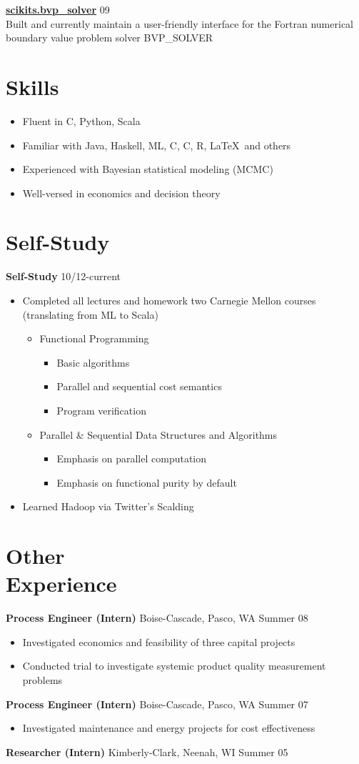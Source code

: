 \documentclass[margin]{res}
\newcommand{\bactivity}[3]{
  {\bf #1} #2 \hfill #3
    \vspace{6pt}
    \begin{itemize} \itemsep -2pt
      }
\newcommand{\eactivity}[0]{\end{itemize}}
\newcommand{\bitem}{\begin{itemize} \itemsep -2pt}
\newcommand{\eitem}{\end{itemize} }
\newcommand{\CPP}
{C\nolinebreak[4]\hspace{-.05em}\raisebox{.22ex}{\footnotesize\bf ++}}
\newcommand{\CS}
{C\nolinebreak[4]\hspace{-.05em}\raisebox{.22ex}{\footnotesize\bf \#}}
\begin{document}
\begin{resume}
    {\bf \href{packages.python.org/scikits.bvp\_solver}{scikits.bvp\_solver}} \hfill  09\\
      Built and currently maintain a user-friendly interface for the Fortran numerical \\
      boundary value problem solver BVP\_SOLVER 

\section{Skills}
    \bitem
      \item Fluent in \CS, Python, Scala
      \item Familiar with Java, Haskell, ML, C, \CPP, R, \LaTeX\ and others
      \item Experienced with Bayesian statistical modeling (MCMC)
      \item Well-versed in economics and decision theory
    \eitem
    
\section{Self-Study}
 \bactivity{Self-Study}{}{10/12-current}
      \item Completed all lectures and homework two Carnegie Mellon courses (translating from ML to Scala)
      \bitem
        \item Functional Programming 
        \bitem
            \item Basic algorithms
            \item Parallel and sequential cost semantics
            \item Program verification
        \eitem
        \item Parallel \& Sequential Data Structures and Algorithms 
        \bitem 
          \item Emphasis on parallel computation
          \item Emphasis on functional purity by default
        \eitem
      \eitem
      \item Learned Hadoop via Twitter's Scalding
    \eactivity
 
  \section{Other \\ Experience}
    \bactivity{Process Engineer (Intern)}{Boise-Cascade, Pasco, WA}{Summer 08}
      \item Investigated economics and feasibility of three capital projects 
      \item Conducted trial to investigate systemic product quality measurement problems 
    \eactivity

    \bactivity{Process Engineer (Intern)}{Boise-Cascade, Pasco, WA}{Summer 07}
      \item Investigated maintenance and energy projects for cost effectiveness 
    \eactivity

    {\bf Researcher (Intern)} Kimberly-Clark, Neenah, WI \hfill  Summer 05

\end{resume} 
\end{document}
